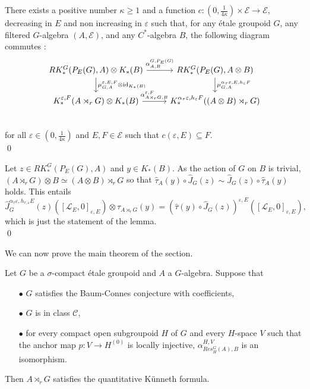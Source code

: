 \begin{lem}\label{KunnethLemma}
There exists a positive number $\kappa\geq 1$ and a function $c : (0,\frac{1}{4\kappa})\times\mathcal E\rightarrow \mathcal E$, decreasing in $E$ and non increasing in $\varepsilon$ such that, for any étale groupoid $G$, any filtered $G$-algebra $(A,\mathcal E)$, and any $C^*$-algebra $B$, the following diagram commutes :
\[\begin{tikzcd}
RK_*^G(P_E(G),A)\otimes K_*(B) \arrow{r}{\alpha^{G,P_E(G)}_{A,B}}\arrow{d}{\mu_{G,A}^{\varepsilon,E,F}\otimes \text{id}_{K_*(B)}} & 
RK_*^G(P_E(G),A\otimes B) \arrow{d}{\mu_{G,A}^{\alpha_ \tau\varepsilon,E,h_\varepsilon F}} \\
K_*^{\varepsilon,F}(A\rtimes_r G)\otimes K_*(B) \arrow{r}{\alpha_{A\rtimes_r G,B}^{\varepsilon,F}} & 
K_*^{\alpha_\tau\varepsilon,h_{\varepsilon}F}((A\otimes B)\rtimes_r G)\\
\end{tikzcd}\] 
for all $\varepsilon\in(0,\frac{1}{4\kappa})$ and $E,F\in\mathcal E$ such that $ c(\varepsilon,E)\subseteq F$. \\
\qed
\end{lem}

\begin{dem}
Let $z\in RK_*^G(P_E(G),A)$ and $y\in K_*(B)$. As the action of $G$ on $B$ is trivial, $(A\rtimes_r G)\otimes B\simeq (A\otimes B)\rtimes_r G$ so that $\hat\tau_A(y)\circ \hat J_{G}(z) \sim \hat J_{G}(z)\circ \hat\tau_A(y) $ holds. This entails
\[\hat J_G^{\alpha_\tau\varepsilon, h_{\tau,\varepsilon}E}(z)\left([\mathcal L_E,0]_{\varepsilon, E} \right)\otimes \tau_{A\rtimes_r G}(y) = 
\left( \hat\tau(y)\circ \hat J_G(z) \right)^{\varepsilon, E}\left([\mathcal L_E,0]_{\varepsilon, E}\right),\]
which is just the statement of the lemma.\\
\qed
\end{dem}


We can now prove the main theorem of the section.

\begin{thm}\label{Kunneth}
Let $G$ be a $\sigma$-compact étale groupoid and $A$ a $G$-algebra. Suppose that 
\begin{itemize}
\item[$\bullet$] $G$ satisfies the Baum-Connes conjecture with coefficients,
\item[$\bullet$] $G$ is in class $\mathcal C$,
\item[$\bullet$] for every compact open subgroupoid $H$ of $G$ and every $H$-space $V$ such that the anchor map $p : V \rightarrow H^{(0)}$ is locally injective, $\alpha_{Res_H^G(A),B}^{H,V}$ is an isomorphism.
\end{itemize} 
Then $A\rtimes_r G$ satisfies the quantitative Künneth formula.
\end{thm}

